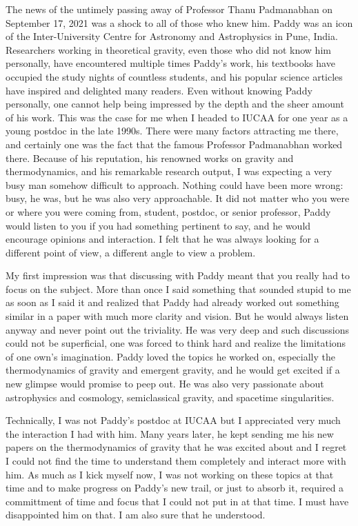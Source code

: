\documentclass[prd, preprint, longbibliography, 11pt]{revtex4-1}
\begin{document}
The news of the untimely passing away of Professor Thanu 
Padmanabhan  on 
September 17, 2021 was a shock to all 
of those who knew him. Paddy was an icon of the Inter-University Centre 
for Astronomy and Astrophysics in Pune, India. Researchers working in 
theoretical gravity, even those who did not know him personally, have 
encountered multiple times Paddy's work, his textbooks have occupied the 
study nights of countless students, and his popular science articles have 
inspired and delighted many readers. Even without knowing Paddy 
personally, one 
cannot help being impressed by the depth and the sheer amount of his work. 
This was the case for me when I headed to IUCAA for one year as a young 
postdoc in the late 1990s. There were many factors attracting me there, 
and certainly one was the fact that the famous Professor Padmanabhan 
worked there. Because of his reputation, his renowned works on gravity and 
thermodynamics, and his remarkable research output, I was expecting a very 
busy man somehow difficult to approach. Nothing could have been more 
wrong: busy, he was, but he was also very approachable. It did not matter 
who you were or where you were coming from, student, postdoc, or senior 
professor, Paddy would listen to you if you had something pertinent to 
say, and he would encourage opinions and interaction. I felt  
that he was always looking for a different point of view, a different 
angle to view a problem.

My first impression was that discussing with Paddy meant that you really 
had to focus on the subject. More than once I said something that sounded 
stupid to me as soon as I said it and realized that Paddy had already 
worked out something similar in a paper with much more clarity and vision. 
But he would always listen anyway and never point out the triviality. He 
was very deep and such discussions could not be superficial, one was 
forced to think hard and realize the limitations of one own's imagination. 
Paddy loved the topics he worked on, especially the thermodynamics of 
gravity and emergent gravity, and he would get excited if a new glimpse 
would promise to peep out. He was also very passionate about astrophysics 
and cosmology, semiclassical gravity, and spacetime singularities.

Technically, I was not Paddy's postdoc at IUCAA but I appreciated very 
much the interaction I had with him. Many years later, he kept sending me 
his new papers on the thermodynamics of gravity that he was excited about 
and I regret I could not find the time to understand them completely and 
interact more with him. As much as I kick myself now, I 
was not working on these topics at that time and to make progress on 
Paddy's new trail, or just to absorb it, required a committment of 
time and focus that I could not put in at that time. I must have 
disappointed him on that. I am also sure that he understood.
\end{document}

